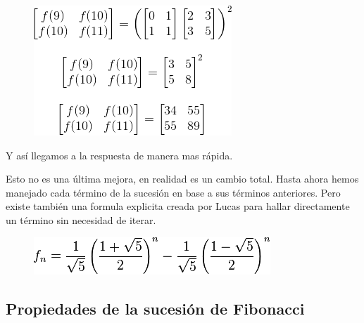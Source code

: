 \begin{figure}[h]
	\centering
	\includegraphics[width=0.3\linewidth]{img/solucion2}
	\label{fig:solucion4}
\end{figure}

Y así llegamos a la respuesta de manera mas rápida.

Esto no es una última mejora, en realidad es un cambio total. Hasta ahora hemos manejado cada término de la sucesión en base a sus términos anteriores. Pero existe también una formula explicita creada por Lucas para hallar directamente un término sin necesidad de iterar.

\begin{figure}[h]
	\centering
	\includegraphics[width=0.3\linewidth]{img/formula-explicita-fibonacci}
	\label{fig:formula-explicita-fibonacci}
\end{figure}


\subsection{Propiedades de la sucesión de Fibonacci}

